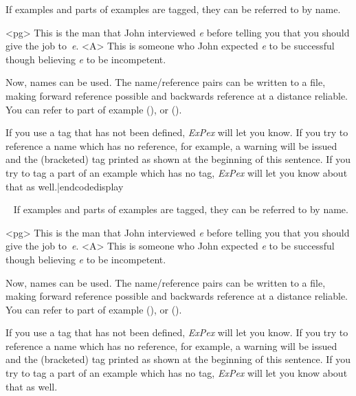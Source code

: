 
\vfil\eject
{}

\codedisplay
If examples and parts of examples are tagged, they can be
referred to by name.

\pex<pg>
\a This is the man that John interviewed {\sl e\/} before
telling you that you should give the job to~{\sl e}.
\a<A> This is someone who John expected {\sl e\/} to be successful
though believing {\sl e\/} to be incompetent.
\xe

Now, names can be used.  The name/reference pairs can be written
to a file, making forward reference possible and backwards
reference at a distance reliable.  You can refer to part
 of example (), or ().

If you use a tag that has not been defined, {\sl ExPex\/} will
let you know. If you try to reference a name which has no
reference,  for example, a warning will be issued
and the (bracketed) tag printed as shown at the beginning of this
sentence.  If you try to tag a part of an example which has no
tag, {\sl ExPex\/} will let you know about that as
well.|endcodedisplay

\framedisplay~
\bigskip
If examples and parts of examples are tagged, they can be
referred to by name.

\pex<pg>
\a This is the man that John interviewed {\sl e\/} before
telling you that you should give the job to~{\sl e}.
\a<A> This is someone who John expected {\sl e\/} to be successful
though believing {\sl e\/} to be incompetent.
\xe

Now, names can be used.  The name/reference pairs can be written
to a file, making forward reference possible and backwards
reference at a distance reliable.  You can refer to part
 of example (), or ().

If you use a tag that has not been defined, {\sl ExPex\/} will
let you know. If you try to reference a name which has no
reference,  for example, a warning will be issued
and the (bracketed) tag printed as shown at the beginning of this
sentence.  If you try to tag a part of an example which has no
tag, {\sl ExPex\/} will let you know about that as
well.
\bigskip
\endframedisplay
